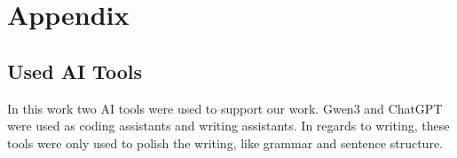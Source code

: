 \documentclass[../report.tex]{subfiles}
\begin{document}
\section*{Appendix}
\label{sec:appendix}

\subsection*{Used AI Tools}
In this work two AI tools were used to support our work. Gwen3 and ChatGPT were used as coding assistants and writing assistants. In regards to writing, these tools were only used to polish the writing, like grammar and sentence structure.
\end{document}
